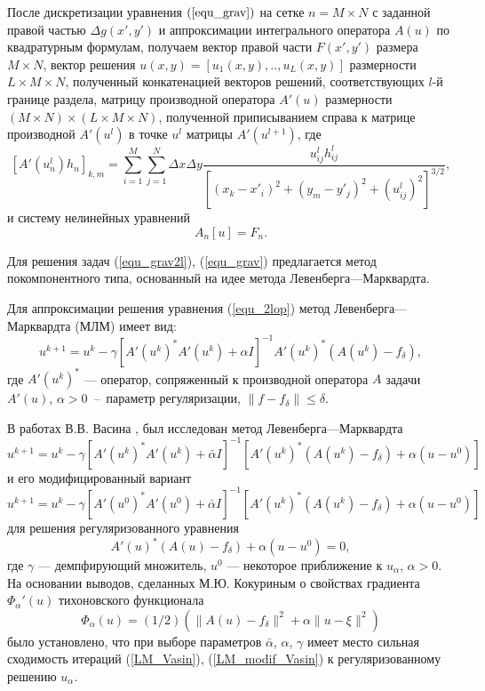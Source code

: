 После дискретизации уравнения $(\ref{equ_grav})$ на сетке $n=M\times N$ с заданной правой частью $\Delta g(x',y')$ и аппроксимации интегрального оператора $A(u)$ по квадратурным формулам, получаем вектор правой части $F(x',y')$ размера  $M\times N$, вектор решения $u(x,y)=[u_1(x,y),..,u_L(x,y)]$ размерности $L\times M\times N$, полученный конкатенацией векторов решений, соответствующих $l$-й границе раздела, матрицу производной оператора $A'(u)$ размерности $(M\times N)\times(L\times M\times N)$, полученной приписыванием справа к матрице производной $A'(u^l)$ в точке $u^l$ матрицы $A'(u^{l+1})$, где
\begin{equation}\label{op_grav_disc_form_mult}
[A'(u_n^l)h_n]_{k,m}=\sum\limits_{i=1}^{M}\sum\limits_{j=1}^{N}
\Delta x\Delta y\frac{u^l_{ij}h^l_{ij}}{[(x_k-x'_i)^2+(y_m-y'_j)^2+(u^l_{ij})^2]^{3/2}},
\end{equation} и систему нелинейных уравнений  
\begin{equation}\label{snl_equ}
A_n[u]=F_n.
\end{equation}

Для решения задач (\ref{equ_grav2l}), (\ref{equ_grav}) предлагается метод покомпонентного типа, основанный на идее метода Левенберга---Марквардта. 

Для аппроксимации решения уравнения (\ref{equ_2lop}) метод Левенберга---Марквардта (МЛМ) имеет вид:
\begin{equation}
u^{k+1}=u^k-\gamma[A'(u^k)^*A'(u^k)+\alpha I]^{-1} A'(u^k)^*(A(u^k)-f_\delta),
\end{equation}
где $A'(u^k)^*$ --- оператор, сопряженный к производной оператора $A$ задачи $A'(u)$, $\alpha>0$~--~параметр регуляризации, $\|f-f_\delta\|\le \delta.$
 
В работах В.В. Васина \cite{Vasin_2012}, \cite{VasPer_2011} был исследован метод Левенберга---Марквардта
\begin{equation}\label{LM_Vasin}
u^{k+1}=u^k-\gamma[A'(u^k)^*A'(u^k)+\bar{\alpha} I]^{-1} [A'(u^k)^*(A(u^k)-f_\delta)+\alpha (u-u^0)]
\end{equation} и его модифицированный вариант
\begin{equation}\label{LM_modif_Vasin}
u^{k+1}=u^k-\gamma[A'(u^0)^*A'(u^0)+\bar{\alpha} I]^{-1} [A'(u^k)^*(A(u^k)-f_\delta)+\alpha (u-u^0)]
\end{equation} для решения регуляризованного уравнения
$$A'(u)^*(A(u)-f_\delta)+	\alpha (u-u^0)=0,$$
где $\gamma$ --- демпфирующий множитель, $u^0$ --- некоторое приближение к $u_\alpha$, $\alpha>0$. На основании выводов, сделанных М.Ю. Кокуриным \cite{Kok_2010} о свойствах градиента $\Phi_\alpha '(u)$ тихоновского функционала $$\Phi_\alpha(u)=(1/2)(\|A(u)-f_\delta\|^2+\alpha\|u-\xi\|^2)$$ было установлено, что при выборе параметров $\bar{\alpha}$, $\alpha$, $\gamma$ имеет место сильная сходимость итераций (\ref{LM_Vasin}), (\ref{LM_modif_Vasin}) к регуляризованному решению $u_\alpha$.

